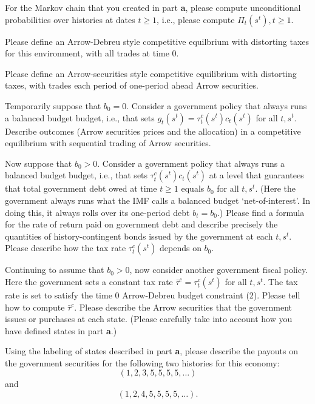 \medskip
{} For the Markov chain that you created in part {\bf a}, please compute unconditional probabilities over  histories  at dates $t \geq 1$,
i.e., please compute $\Pi_t(s^t), t \geq 1$.

\medskip
{} Please define an Arrow-Debreu style competitive equilbrium with distorting taxes for this environment, with all trades at time $0$.

\medskip
{} Please define an  Arrow-securities style competitive equilibrium with distorting taxes, with trades each period of one-period ahead
Arrow securities.

\medskip
{}  Temporarily suppose that $b_0 = 0$.  Consider a government policy that always runs a balanced budget budget, i.e.,
that  sets $g_t(s^t) = \tau_t^c(s^t) c_t(s^t)$ for all $t, s^t$.  Describe  outcomes (Arrow securities prices and the allocation) in a competitive
equilibrium with sequential trading of Arrow securities.

\medskip
{}  Now suppose that $b_0 >0$.  Consider a government policy that always runs a balanced budget budget, i.e.,
that  sets $\tau_t^c(s^t) c_t(s^t)$ at a level that guarantees that total government debt owed at time $t\geq 1$ equals $b_0$ for all $t, s^t$.  (Here the
government always runs what the IMF calls a  balanced budget `net-of-interest'.  In doing this, it always rolls over its one-period debt $b_t = b_0$.)
Please find a formula for the rate of return paid on government debt
and describe precisely the quantities of  history-contingent bonds issued by the government at each $t, s^t$.  Please describe how the tax rate
$\tau_t^c(s^t)$ depends on $b_0$.

\medskip


  Continuing to assume that  $b_0  >0$, now consider another government fiscal policy.  Here the government
sets a constant tax rate $\bar \tau^c = \tau_t^c(s^t)$ for all $t, s^t$.  The tax rate is set to satisfy the time $0$ Arrow-Debreu
budget constraint (2).  Please tell how to compute $\bar \tau^c$. Please describe the Arrow securities that the government
issues or purchases at each state. (Please carefully take into account how you have defined states in part {\bf a}.)

\medskip
{} Using the labeling of states described in part {\bf a},
please describe the payouts on the government securities for the following two histories  for this economy:
$$ (1, 2, 3, 5, 5, 5, 5, \ldots) $$
and
$$ (1, 2, 4, 5, 5, 5, 5, \ldots).$$


